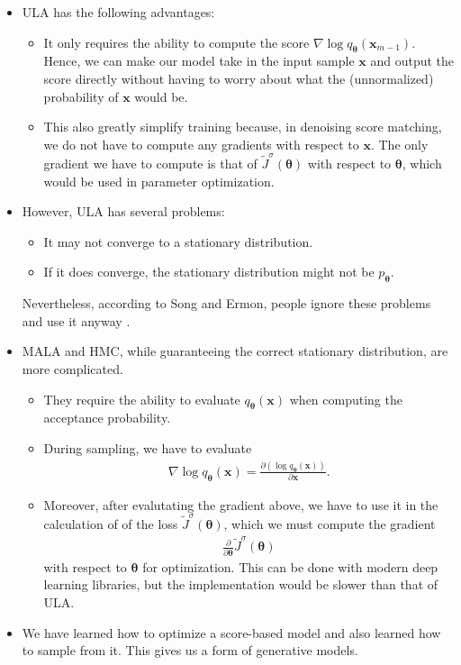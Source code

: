 \documentclass[10pt]{article}
\newcommand{\ve}[1]{\mathbf{#1}}
\newcommand{\ves}[1]{\boldsymbol{#1}}
\begin{document}
\begin{itemize}
  \item ULA has the following advantages:
  \begin{itemize}
    \item It only requires the ability to compute the score $\nabla \log q_{\ves{\theta}}(\ve{x}_{m-1})$. Hence, we can make our model take in the input sample $\ve{x}$ and output the score directly without having to worry about what the (unnormalized) probability of $\ve{x}$ would be. 
    
    \item This also greatly simplify training because, in denoising score matching, we do not have to compute any gradients with respect to $\ve{x}$. The only gradient we have to compute is that of $\widetilde{J}^\sigma(\ves{\theta})$ with respect to $\ves{\theta}$, which would be used in parameter optimization.
  \end{itemize}
  
  \item However, ULA has several problems:
  \begin{itemize}
    \item It may not converge to a stationary distribution.
    \item If it does converge, the stationary distribution might not be $p_{\ves{\theta}}$.
  \end{itemize}
  Nevertheless, according to Song and Ermon, people ignore these problems and use it anyway \cite{Song:2019}.

  \item MALA and HMC, while guaranteeing the correct stationary distribution, are more complicated.
  \begin{itemize}
    \item They require the ability to evaluate $q_{\ves{\theta}}(\ve{x})$ when computing the acceptance probability.
    
    \item During sampling, we have to evaluate
    \begin{align*}
      \nabla \log q_{\ves{\theta}}(\ve{x}) 
      = \frac{\partial (\log q_{\ves{\theta}}(\ve{x}))}{\partial \ve{x}}.
    \end{align*}

    \item Moreover, after evalutating the gradient above, we have to use it in the calculation of of the loss $\widetilde{J}^\sigma(\ves{\theta})$, which we must compute the gradient 
    \begin{align*}
      \frac{\partial}{\partial \ves{\theta}} \widetilde{J}^\sigma(\ves \theta)
    \end{align*}
    with respect to $\ves{\theta}$ for optimization. This can be done with modern deep learning libraries, but the implementation would be slower than that of ULA.
  \end{itemize}

  \item We have learned how to optimize a score-based model and also learned how to sample from it. This gives us a form of generative models.
\end{itemize}
\end{document}
